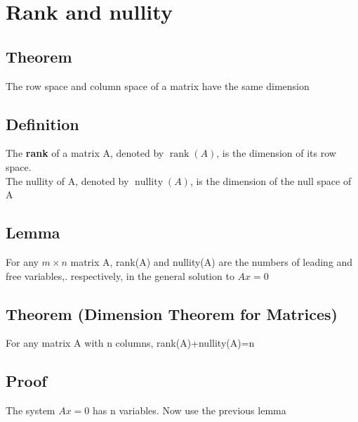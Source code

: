 \documentclass{article}[18pt]
\begin{document}
\section{Rank and nullity}
\subsection{Theorem}
The row space and column space of a matrix have the same dimension
\subsection{Definition}
The \textbf{rank} of a matrix A, denoted by $\operatorname{rank}(A)$, is the dimension of its row space. \\
The nullity of A, denoted by $\operatorname{nullity}(A)$, is the dimension of the null space of A
\subsection{Lemma}
For any $m\times n$ matrix A, rank(A) and nullity(A) are the numbers of leading and free variables,. respectively, in the general solution to $Ax=0$
\subsection{Theorem (Dimension Theorem for Matrices)}
For any matrix A with n columns, rank(A)+nullity(A)=n
\subsection{Proof}
The system $Ax=0$ has n variables. Now use the previous lemma
\end{document}
